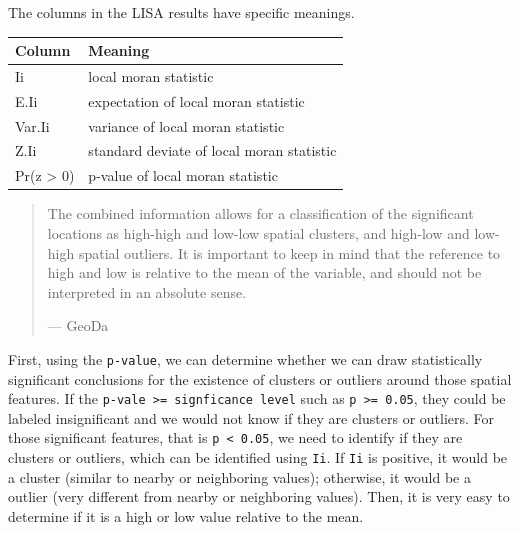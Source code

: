\documentclass[
  11pt,
]{book}
\begin{document}
The columns in the LISA results have specific meanings.

\begin{longtable}[]{@{}ll@{}}
\toprule
Column & Meaning \\
\midrule
\endhead
Ii & local moran statistic \\
E.Ii & expectation of local moran statistic \\
Var.Ii & variance of local moran statistic \\
Z.Ii & standard deviate of local moran statistic \\
Pr(z \textgreater{} 0) & p-value of local moran statistic \\
\bottomrule
\end{longtable}

\begin{quote}
The combined information allows for a classification of the significant locations as high-high and low-low spatial clusters, and high-low and low-high spatial outliers. It is important to keep in mind that the reference to high and low is relative to the mean of the variable, and should not be interpreted in an absolute sense.

--- GeoDa
\end{quote}

First, using the \texttt{p-value}, we can determine whether we can draw statistically significant conclusions for the existence of clusters or outliers around those spatial features. If the \texttt{p-vale\ \textgreater{}=\ signficance\ level} such as \texttt{p\ \textgreater{}=\ 0.05}, they could be labeled insignificant and we would not know if they are clusters or outliers. For those significant features, that is \texttt{p\ \textless{}\ 0.05}, we need to identify if they are clusters or outliers, which can be identified using \texttt{Ii}. If \texttt{Ii} is positive, it would be a cluster (similar to nearby or neighboring values); otherwise, it would be a outlier (very different from nearby or neighboring values). Then, it is very easy to determine if it is a high or low value relative to the mean.
\end{document}
